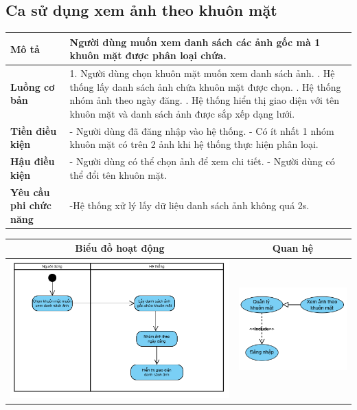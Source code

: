 \subsection{Ca sử dụng xem ảnh theo khuôn mặt}

\vspace{0.5cm}

\noindent 
\begin{tabularx}{\linewidth}{| l | X |} 
\hline 
\textbf{Mô tả} & Người dùng muốn xem danh sách các ảnh gốc mà 1 khuôn mặt được phân loại chứa. \\
\hline 
\textbf{Luồng cơ bản} & 1. Người dùng chọn khuôn mặt muốn xem danh sách ảnh. \newline
                       2. Hệ thống lấy danh sách ảnh chứa khuôn mặt được chọn. \newline
                       3. Hệ thống nhóm ảnh theo ngày đăng. \newline
                       5. Hệ thống hiển thị giao diện với tên khuôn mặt và danh sách ảnh được sắp xếp dạng lưới. \\
\hline
\textbf{Tiền điều kiện} & - Người dùng đã đăng nhập vào hệ thống. \newline
                          - Có ít nhất 1 nhóm khuôn mặt có trên 2 ảnh khi hệ thống thực hiện phân loại. \\
\hline 
\textbf{Hậu điều kiện} & - Người dùng có thể chọn ảnh để xem chi tiết. \newline
                          - Người dùng có thể đổi tên khuôn mặt. \\
\hline 
\textbf{Yêu cầu phi chức năng} & -Hệ thống xử lý lấy dữ liệu danh sách ảnh không quá 2s. \\
\hline 
\end{tabularx}

\vspace{0.8cm}

\noindent 
\begin{tabular}{| c | c |}
    \hline
    \textbf{Biểu đồ hoạt động} & \textbf{Quan hệ} \\ 
    \hline
    \includegraphics[width=0.6\linewidth]{figures/c3/3-3-11-activity-diagram.png} 
    &  
    \includegraphics[width=0.35\linewidth]{figures/c3/3-3-11-relationship.png} \\ 
    \hline
\end{tabular}

